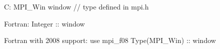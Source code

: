 C:
MPI_Win window // type defined in mpi.h

Fortran:
Integer :: window

Fortran with 2008 support:
use mpi_f08
Type(MPI_Win) :: window
